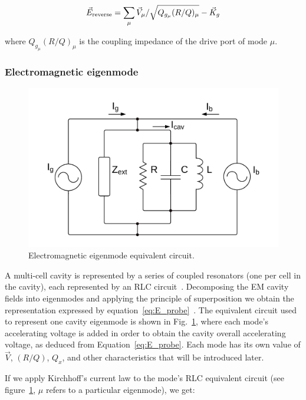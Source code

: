 \documentclass[a4paper,12pt]{article}
\begin{document}
\begin{equation}
  \vec E_{\rm reverse}=\sum_\mu \vec V_\mu / \sqrt{Q_{g_{\mu}}(R/Q)_\mu} - \vec K_g
  \label{eq:E_reverse}
\end{equation}

\noindent where $Q_{g_{\mu}}(R/Q)_\mu$ is the coupling impedance of the drive port of mode $\mu$.

\subsubsection{Electromagnetic eigenmode}

\begin{figure}
\centering
\includegraphics[scale=0.20]{../figures/cavity_eq_circuit.png}
\caption{Electromagnetic eigenmode equivalent circuit.}
\label{fig:cav_eq_circuit}
\end{figure}

A multi-cell cavity is represented by a series of coupled resonators (one per cell in the cavity), each represented by an RLC circuit~\cite{ref:montgomery}. Decomposing the EM cavity fields into eigenmodes and applying the principle of superposition we obtain the representation expressed by equation~\ref{eq:E_probe}~\cite{ref:cell_modes}. The equivalent circuit used to represent one cavity eigenmode is shown in Fig.~\ref{fig:cav_eq_circuit}, where each mode's accelerating voltage is added in order to obtain the cavity overall accelerating voltage, as deduced from Equation~\ref{eq:E_probe}. Each mode has its own value of $\vec V$, $(R/Q)$, $Q_x$, and other characteristics that will be introduced later.

If we apply Kirchhoff's current law to the mode's RLC equivalent circuit (see figure~\ref{fig:cav_eq_circuit}, $\mu$ refers to a particular eigenmode), we get:
\end{document}
